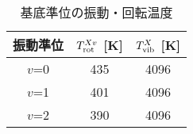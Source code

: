 \begin{table}
    \caption{基底準位の振動・回転温度}
    \label{table:fitting-result}
    \centering
    \begin{tabular}{ccc}
        \hline
        振動準位 & $T^{Xv}_{\rm rot}$ [K] & $T^{X}_{\rm vib}$ [K]\\
        \hline
        $v$=0 & 435 & 4096\\
        $v$=1 & 401 & 4096\\
        $v$=2 & 390 & 4096\\
        \hline
    \end{tabular}
\end{table}
